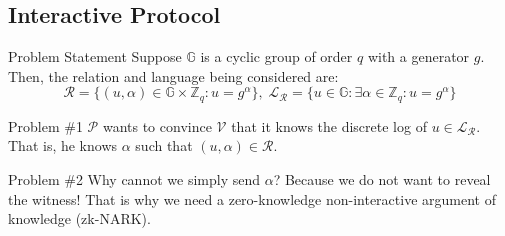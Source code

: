 \documentclass{zkdl-presentation-template}
\begin{document}
    \subsection{Interactive Protocol}
    \begin{frame}{Problem Statement}
        Suppose $\mathbb{G}$ is a cyclic group of order $q$ with a generator $g$. Then, the relation and language being considered are:
        \begin{equation*}
            \mathcal{R} = \{(u, \alpha) \in \mathbb{G} \times \mathbb{Z}_q: u = g^{\alpha}\}, \; \mathcal{L}_{\mathcal{R}} = \{u \in \mathbb{G}: \exists \alpha \in \mathbb{Z}_q: u = g^{\alpha}\}
        \end{equation*}
        \pause

        \begin{block}{Problem \#1}
            $\mathcal{P}$ wants to convince $\mathcal{V}$ that it knows the discrete log of $u \in \mathcal{L}_{\mathcal{R}}$. That is, he knows $\alpha$ such that $(u,\alpha) \in \mathcal{R}$.
        \end{block}
        \pause

        \begin{block}{Problem \#2}
            Why cannot we simply send $\alpha$? Because we do not want to reveal the witness! That is why we need a zero-knowledge non-interactive argument of knowledge (zk-NARK).
        \end{block}
    \end{frame}
\end{document}

